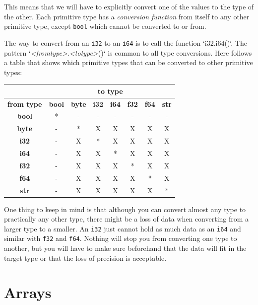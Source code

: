 \documentclass[11pt,fleqn,openany]{book} %
\begin{document}
This means that we will have to explicitly convert one of the values to the type of the other. Each primitive type has a \emph{conversion function} from itself to any other primitive type, except \texttt{bool} which cannot be converted to or from.

The way to convert from an \texttt{i32} to an \texttt{i64} is to call the function `i32.i64()`. The pattern `\textit{<fromtype>}.\textit{<totype>}()` is common to all type conversions.  Here follows a table that shows which primitive types that can be converted to other primitive types:

\begin{center}
    \begin{tabular}{|c|c|c|c|c|c|c|c|}
        \hline
         & \multicolumn{7}{|c|}{\textbf{to type}} \\
        \hline
        \textbf{from type} & \textbf{bool} & \textbf{byte} & \textbf{i32} & \textbf{i64} & \textbf{f32} & \textbf{f64} & \textbf{str} \\
        \hline
        \textbf{bool}     & * & - & - & - & - & - & - \\
        \textbf{byte}     & - & * & X & X & X & X & X \\
        \textbf{i32}      & - & X & * & X & X & X & X \\
        \textbf{i64}      & - & X & X & * & X & X & X \\
        \textbf{f32}      & - & X & X & X & * & X & X \\
        \textbf{f64}      & - & X & X & X & X & * & X \\
        \textbf{str}      & - & X & X & X & X & X & * \\
        \hline 
    \end{tabular}
\end{center}

One thing to keep in mind is that although you can convert almost any type to practically any other type, there might be a loss of data when converting from a larger type to a smaller.  An \texttt{i32} just cannot hold as much data as an \texttt{i64} and similar with \texttt{f32} and \texttt{f64}. Nothing will stop you from converting one type to another, but you will have to make sure beforehand that the data will fit in the target type or that the loss of precision is acceptable.

\section{Arrays}
\end{document}
